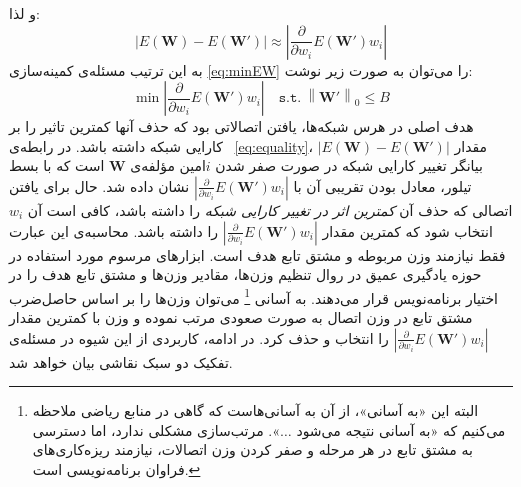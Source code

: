 \documentclass[11pt, twoside]{imsproc}
\newcommand{\norm}[1]{\left\lVert#1\right\rVert}
\begin{document}
و لذا:
\begin{equation}
|E(\mathbf{W})-E(\mathbf{W'})| \approx  \left|\frac{\partial}{\partial w_i}E(\mathbf{W'})w_i\right|
\label{eq:equality}
\end{equation}
به این ترتیب مسئله‌ی کمینه‌سازی
\eqref{eq:minEW}
را می‌توان به صورت زیر نوشت:
\begin{equation}
\min \left|\frac{\partial}{\partial w_i}E(\mathbf{W'})w_i\right| \quad \mathtt{s.t.}\  \norm{\mathbf{W'}}_0 \le B
\label{eq:minREW}
\end{equation}
 هدف اصلی در هرس شبکه‌ها، یافتن اتصالاتی بود که حذف آنها کمترین تاثیر را بر کارایی شبکه داشته باشد.
 در رابطه‌ی
~\eqref{eq:equality}، 
مقدار
$|E(\mathbf{W})-E(\mathbf{W'})|$
بیانگر تغییر کارایی شبکه در صورت صفر شدن
$i$امین
مؤلفه‌ی
$\mathbf{W}$
است که با بسط تیلور،
معادل بودن تقریبی آن با
$\left|\frac{\partial}{\partial w_i}E(\mathbf{W'})w_i\right|$
نشان داده شد.
حال برای یافتن اتصالی که حذف آن
\textit{
  کمترین اثر در تغییر کارایی شبکه } را داشته باشد، کافی است آن
$w_i$
انتخاب شود که  کمترین مقدار
$\left|\frac{\partial}{\partial w_i}E(\mathbf{W'})w_i\right|$
را داشته باشد.
 محاسبه‌ی این عبارت فقط نیازمند وزن مربوطه و مشتق تابع هدف  است. ابزارهای مرسوم مورد استفاده در حوزه یادگیری عمیق
در روال تنظیم وزن‌ها، مقادیر وزن‌ها و مشتق تابع هدف را  در اختیار برنامه‌نویس قرار می‌دهند. %
به آسانی%
\footnote{
البته این «به آسانی»، از آن به آسانی‌هاست که گاهی در منابع ریاضی ملاحظه می‌کنیم که «به آسانی نتیجه می‌شود
$\dots$».
مرتب‌سازی مشکلی ندارد، اما دسترسی به مشتق تابع در هر مرحله و صفر کردن وزن اتصالات، نیازمند ریزه‌کاری‌های فراوان برنامه‌نویسی است.
}
  می‌توان وزن‌ها را بر اساس حاصل‌ضرب مشتق تابع در وزن اتصال به صورت صعودی مرتب نموده و وزن با کمترین مقدار
 $\left|\frac{\partial}{\partial w_i}E(\mathbf{W'})w_i\right|$
   را انتخاب و حذف کرد.
در ادامه، کاربردی از این شیوه در مسئله‌ی تفکیک دو سبک نقاشی بیان خواهد شد.
%
\end{document}
